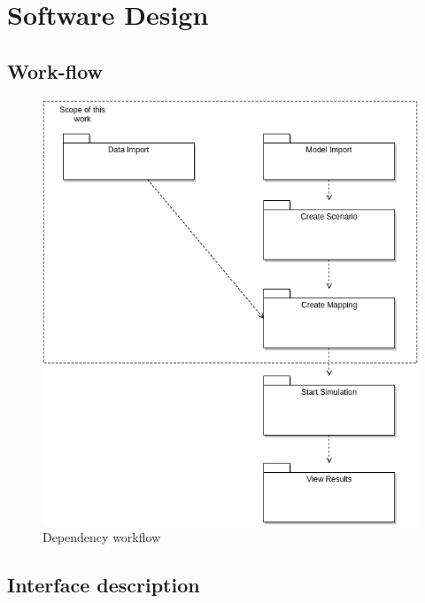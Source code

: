 \chapter{Software Design}
\section{Work-flow}
\begin{figure}[H]
	\centering\includegraphics[width=.75\textwidth]{res/Dependency-workflow}
	\caption{Dependency workflow}
	\label{fig:dependency-workflow}
\end{figure}
\section{Interface description}
